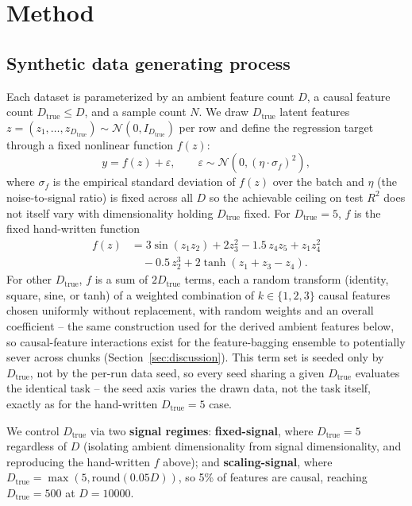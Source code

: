 \documentclass{article}
\begin{document}
\section{Method}
\label{sec:method}

\subsection{Synthetic data generating process}
\label{sec:dgp}

Each dataset is parameterized by an ambient feature count $D$, a causal feature count
$D_{\text{true}} \leq D$, and a sample count $N$. We draw $D_{\text{true}}$ latent
features $z = (z_1, \dots, z_{D_{\text{true}}}) \sim \mathcal{N}(0, I_{D_{\text{true}}})$
per row and define the regression target through a fixed nonlinear function $f(z)$:
\begin{equation}
y = f(z) + \varepsilon, \qquad \varepsilon \sim \mathcal{N}(0, (\eta \cdot \sigma_{f})^2),
\end{equation}
where $\sigma_f$ is the empirical standard deviation of $f(z)$ over the batch and
$\eta$ (the noise-to-signal ratio) is fixed across all $D$ so the achievable ceiling on
test $R^2$ does not itself vary with dimensionality holding $D_{\text{true}}$ fixed.
For $D_{\text{true}}=5$, $f$ is the fixed hand-written function
\begin{align}
f(z) &= 3\sin(z_1 z_2) + 2 z_3^2 - 1.5\, z_4 z_5 + z_1 z_4^2 \nonumber \\
     &\quad - 0.5\, z_2^3 + 2\tanh(z_1 + z_3 - z_4).
\end{align}
For other $D_{\text{true}}$, $f$ is a sum of $2 D_{\text{true}}$ terms, each a random
transform (identity, square, sine, or tanh) of a weighted combination of $k \in
\{1,2,3\}$ causal features chosen uniformly without replacement, with random weights
and an overall coefficient -- the same construction used for the derived ambient
features below, so causal-feature interactions exist for the feature-bagging ensemble
to potentially sever across chunks (Section~\ref{sec:discussion}). This term set is
seeded only by $D_{\text{true}}$, not by the per-run data seed, so every seed sharing a
given $D_{\text{true}}$ evaluates the identical task -- the seed axis varies the drawn
data, not the task itself, exactly as for the hand-written $D_{\text{true}}=5$ case.

We control $D_{\text{true}}$ via two \textbf{signal regimes}: \textbf{fixed-signal},
where $D_{\text{true}}=5$ regardless of $D$ (isolating ambient dimensionality from
signal dimensionality, and reproducing the hand-written $f$ above); and
\textbf{scaling-signal}, where $D_{\text{true}} = \max(5, \text{round}(0.05 D))$, so
5\% of features are causal, reaching $D_{\text{true}}=500$ at $D=10000$.
\end{document}
